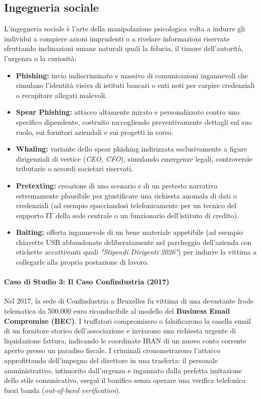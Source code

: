 \documentclass[../../main.tex]{subfiles}
\begin{document}
\subsection{Ingegneria sociale}
\label{subsec:ingegneria_sociale}

L'ingegneria sociale è l'arte della manipolazione psicologica volta a indurre gli individui a compiere azioni imprudenti o a rivelare informazioni riservate sfruttando inclinazioni umane naturali quali la fiducia, il timore dell'autorità, l'urgenza o la curiosità:

\begin{itemize}
    \item \textbf{Phishing:} invio indiscriminato e massivo di comunicazioni ingannevoli che simulano l'identità visiva di istituti bancari o enti noti per carpire credenziali o recapitare allegati malevoli.
    \item \textbf{Spear Phishing:} attacco altamente mirato e personalizzato contro uno specifico dipendente, costruito raccogliendo preventivamente dettagli sul suo ruolo, sui fornitori aziendali e sui progetti in corso.
    \item \textbf{Whaling:} variante dello spear phishing indirizzata esclusivamente a figure dirigenziali di vertice (\textit{CEO, CFO}), simulando emergenze legali, controversie tributarie o accordi societari riservati.
    \item \textbf{Pretexting:} creazione di uno scenario e di un pretesto narrativo estremamente plausibile per giustificare una richiesta anomala di dati o credenziali (ad esempio spacciandosi telefonicamente per un tecnico del supporto IT della sede centrale o un funzionario dell'istituto di credito).
    \item \textbf{Baiting:} offerta ingannevole di un bene materiale appetibile (ad esempio chiavette USB abbandonate deliberatamente nel parcheggio dell'azienda con etichette accattivanti quali \textit{"Stipendi Dirigenti 2026"}) per indurre la vittima a collegarle alla propria postazione di lavoro.
\end{itemize}

\paragraph{Caso di Studio 3: Il Caso Confindustria (2017)}
Nel 2017, la sede di Confindustria a Bruxelles fu vittima di una devastante frode telematica da 500.000 euro riconducibile al modello del \textbf{Business Email Compromise (BEC)}. I truffatori compromisero o falsificarono la casella email di un fornitore storico dell'associazione e inviarono una richiesta urgente di liquidazione fattura, indicando le coordinate IBAN di un nuovo conto corrente aperto presso un paradiso fiscale. I criminali cronometrarono l'attacco approfittando dell'impegno del direttore in una trasferta: il personale amministrativo, intimorito dall'urgenza e ingannato dalla perfetta imitazione dello stile comunicativo, eseguì il bonifico senza operare una verifica telefonica fuori banda (\textit{out-of-band verification}).
\end{document}
